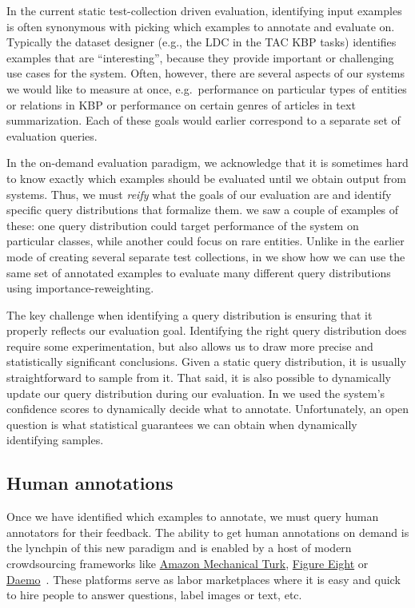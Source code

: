 In the current static test-collection driven evaluation, identifying input examples is often synonymous with picking which examples to annotate and evaluate on.
Typically the dataset designer (e.g., the LDC in the TAC KBP tasks) identifies examples that are ``interesting'', because they provide important or challenging use cases for the system.
Often, however, there are several aspects of our systems we would like to measure at once, e.g.\ performance on particular types of entities or relations in KBP or performance on certain genres of articles in text summarization.
Each of these goals would earlier correspond to a separate set of evaluation queries. 

In the on-demand evaluation paradigm, 
  we acknowledge that it is sometimes hard to know exactly which examples should be evaluated until we obtain output from systems.
Thus, we must \textit{reify} what the goals of our evaluation are and identify specific query distributions that formalize them.
 we saw a couple of examples of these: one query distribution could target performance of the system on particular classes, while another could focus on rare entities.
Unlike in the earlier mode of creating several separate test collections, in  we show how we can use the same set of annotated examples to evaluate many different query distributions using importance-reweighting.

The key challenge when identifying a query distribution is ensuring that it properly reflects our evaluation goal.
Identifying the right query distribution does require some experimentation, but also allows us to draw more precise and statistically significant conclusions.
Given a static query distribution, it is usually straightforward to sample from it.
That said, it is also possible to dynamically update our query distribution during our evaluation.
In  we used the system's confidence scores to dynamically decide what to annotate.
Unfortunately, an open question is what statistical guarantees we can obtain when dynamically identifying samples.

\subsection{Human annotations}
Once we have identified which examples to annotate, we must query human annotators for their feedback.
The ability to get human annotations on demand is the lynchpin of this new paradigm and is enabled by a host of modern crowdsourcing frameworks like \href{requester.mturk.com}{Amazon Mechanical Turk}, \href{https://www.figure-eight.com/}{Figure Eight} or \href{https://daemo.org}{Daemo}~\citep{gaikwad2015daemo}.
These platforms serve as labor marketplaces where it is easy and quick to hire people to answer questions, label images or text, etc.

